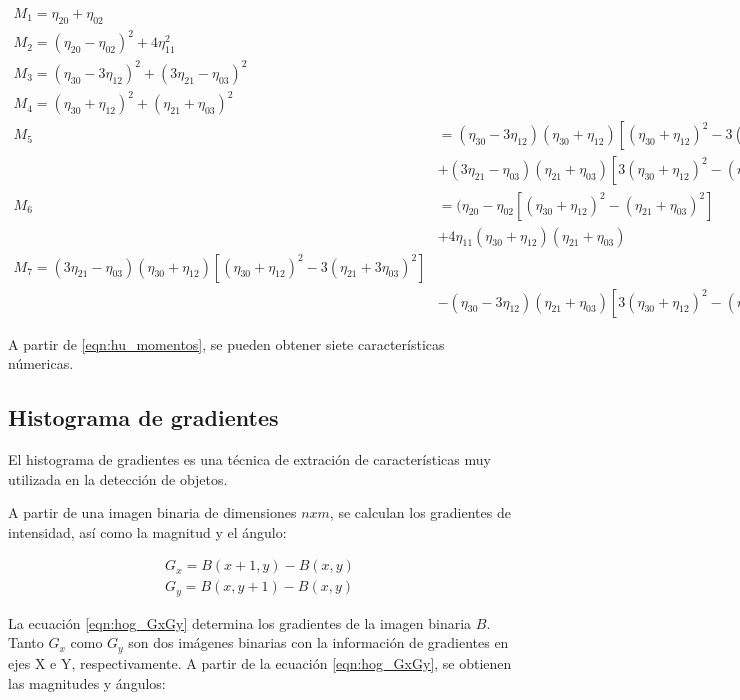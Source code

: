 \begin{equation}
	\label{eqn:hu_momentos}
	\begin{split}
		M_{1} = \eta_{20} + \eta_{02} \\
		M_{2} = (\eta_{20}-\eta_{02})^{2} + 4\eta_{11}^{2} \\
		M_{3} = (\eta_{30}-3\eta_{12})^{2} + (3\eta_{21}-\eta_{03})^{2} \\
		M_{4} = (\eta_{30}+\eta_{12})^{2} + (\eta_{21}+\eta_{03})^{2} \\
		M_{5} & = (\eta_{30}-3\eta_{12})(\eta_{30}+\eta_{12})[(\eta_{30}+\eta_{12})^{2}-3(\eta_{21}+3\eta_{03})^{2}] \\
		& +(3\eta_{21}-\eta_{03})(\eta_{21}+\eta_{03})[3(\eta_{30}+\eta_{12})^{2}-(\eta_{21}+\eta_{03})^{2}] \\
		M_{6} & = (\eta_{20}-\eta_{02}[(\eta_{30}+\eta_{12})^{2}-(\eta_{21}+\eta_{03})^{2}] \\
		& +4\eta_{11}(\eta_{30}+\eta_{12})(\eta_{21}+\eta_{03}) \\
		M_{7} = (3\eta_{21}-\eta_{03})(\eta_{30}+\eta_{12})[(\eta_{30}+\eta_{12})^{2}-3(\eta_{21}+3\eta_{03})^{2}] \\
		& -(\eta_{30}-3\eta_{12})(\eta_{21}+\eta_{03})[3(\eta_{30}+\eta_{12})^{2}-(\eta_{21}+\eta_{03})^{2}]
	\end{split}
\end{equation}

A partir de \ref{eqn:hu_momentos}, se pueden obtener siete características númericas.

\pagebreak
\subsection{Histograma de gradientes}

El histograma de gradientes \cite{osti_6007283} es una técnica de extración de características muy utilizada en la detección de objetos.

A partir de una imagen binaria de dimensiones $ nxm $, se calculan los gradientes de intensidad, así como la magnitud y el ángulo:

\begin{equation}
	\label{eqn:hog_GxGy}
	\begin{split}		
		G_{x} = B(x+1,y) - B(x,y) \\
		G_{y} = B(x,y+1) - B(x,y)
	\end{split}
\end{equation}

La ecuación \ref{eqn:hog_GxGy} determina los gradientes de la imagen binaria \(B\). Tanto \(G_{x}\) como \(G_{y}\) son dos imágenes binarias con la información de gradientes en ejes X e Y, respectivamente. 
A partir de la ecuación \ref{eqn:hog_GxGy}, se obtienen las magnitudes y ángulos:

